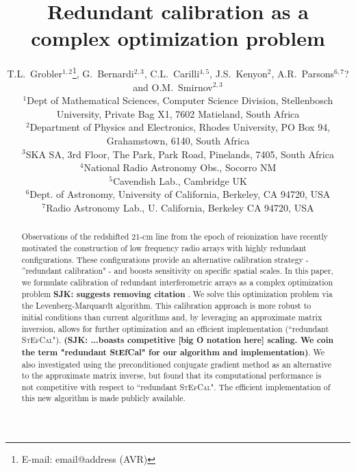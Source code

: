 \documentclass[useAMS,usenatbib]{mn2e}
\title[Redundant interferometric calibration as a complex optimization problem]{Redundant calibration as a complex optimization problem}
\author[T.L.~Grobler et al.]{T.L.~Grobler$^{1,2}$\thanks{E-mail: email@address (AVR)}, G.~Bernardi$^{2,3}$, C.L.~Carilli$^{4,5}$, J.S.~Kenyon$^{2}$, A.R.~Parsons$^{6,7}$? \newauthor and O.M.~Smirnov$^{2,3}$\\
$^{1}$Dept of Mathematical Sciences, Computer Science Division, Stellenbosch University, Private Bag X1, 7602 Matieland, South Africa\\
$^{2}$Department of Physics and Electronics, Rhodes University, PO Box 94, Grahamstown, 6140, South Africa\\
$^{3}$SKA SA, 3rd Floor, The Park, Park Road, Pinelands, 7405, South Africa\\
$^{4}$National Radio Astronomy Obs., Socorro NM\\
$^{5}$Cavendish Lab., Cambridge UK\\
$^{6}$Dept. of Astronomy, University of California, Berkeley, CA 94720, USA\\
$^{7}$Radio Astronomy Lab., U. California, Berkeley CA 94720, USA}
\begin{document}

\pagerange{\pageref{firstpage}--\pageref{lastpage}} 

\maketitle

\label{firstpage}

\begin{abstract}
Observations of the redshifted 21-cm line from the epoch of reionization have recently motivated the construction of low 
frequency radio arrays with highly redundant configurations. These configurations provide an alternative calibration strategy - 
''redundant calibration" - and boosts sensitivity on specific spatial scales. In this paper, we formulate 
calibration of redundant interferometric arrays as a complex optimization problem {\bf SJK: suggests removing citation} \citep[i.e.,][]{Smirnov2015}. 
We solve this optimization problem via the Levenberg-Marquardt algorithm. This calibration approach is more 
robust to initial conditions than current algorithms and, by leveraging an approximate matrix inversion, allows for further optimization and an efficient implementation (``redundant \textsc{StEfCal}"). {\bf (SJK: ...boasts competitive [big O notation here] scaling. We coin the term "redundant StEfCal" for our algorithm and implementation)}.  We also investigated using the preconditioned conjugate gradient method as an alternative to the approximate matrix inverse, but found that its computational performance is not competitive with respect to ``redundant \textsc{StEfCal}". The efficient implementation of this new algorithm is made publicly available.

\end{abstract}
\end{document}
